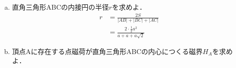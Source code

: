 \documentclass[dvipdfmx]{ujarticle}
\begin{document}
\begin{enumerate}[(a)]
\begin{align*}
	&=\frac{m^{2}}{16\pi \mu_{0}a^{2}}\sqrt{20+8\sqrt{2}}\\
	&=\frac{m^{2}}{8\pi \mu_{0}a^{2}}\sqrt{5+2\sqrt{2}}\,[\rm{A/m}]\quad 左斜め上向き
	\end{align*}
	\item 直角三角形ABCの内接円の半径$r$を求めよ．
	\begin{align*}
		r&=\frac{2S}{|AB|+|BC|+|AC|}\\
		&=\frac{2\cdot \frac{1}{2}a^{2}}{a+a+a\sqrt{2}}
	\end{align*}
	\item 頂点Aに存在する点磁荷が直角三角形ABCの内心につくる磁界$H_{A}$を求めよ．
	\begin{align*}
	\end{align*}
\end{enumerate}
\end{document}
